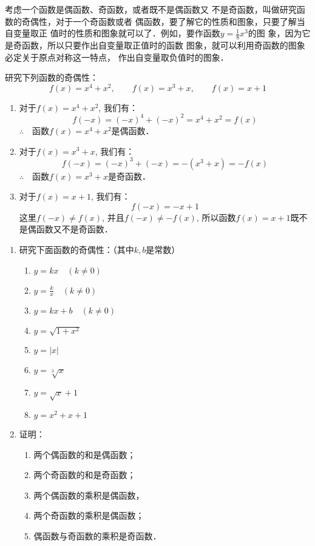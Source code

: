 考虑一个函数是偶函数、奇函数，或者既不是偶函数又
不是奇函数，叫做研究函数的奇偶性，对于一个奇函数或者
偶函数，要了解它的性质和图象，只要了解当自变量取正
值时的性质和图象就可以了．例如，要作函数$y=\frac{1}{8}x^3$的图
象，因为它是奇函数，所以只要作出自变量取正值时的函数
图象，就可以利用奇函数的图象必定关于原点对称这一特点，
作出自变量取负值时的图象．

\begin{example}
研究下列函数的奇偶性：
\[f(x)=x^4+x^2,\qquad f(x)=x^3+x,\qquad f(x)=x+1\]   
\end{example}

\begin{solution}
\begin{enumerate}
    \item 对于$f(x)=x^4+x^2$, 我们有：
    \[f(-x)=(-x)^4+(-x)^2=x^4+x^2=f(x)\]
    $\therefore\quad $函数$f(x)=x^4+x^2$是偶函数．
    \item 对于$f(x)=x^3+x$, 我们有：
    \[f(-x)=(-x)^3+(-x)=-(x^3+x)=-f(x)\]
    $\therefore\quad $函数$f(x)=x^3+x$是奇函数．
    \item 对于$f(x)=x+1$, 我们有：
    \[f(-x)=-x+1\]
    这里$f(-x)\ne f(x)$, 并且$f(-x)\ne -f(x)$, 所以函数$f(x)=
x+1$既不是偶函数又不是奇函数．
\end{enumerate} 
\end{solution}

\begin{ex}
\begin{enumerate}
    \item  研究下面函数的奇偶性：（其中$k,b$是常数）
\begin{multicols}{2}
\begin{enumerate}
    \item $y=kx\quad (k\ne 0)$
    \item $y=\frac{k}{x}\quad (k\ne 0)$
    \item $y=kx+b\quad (k\ne 0)$
    \item $y=\sqrt{1+x^2}$
    \item $y=|x|$
    \item $y=\sqrt[3]{x}$
    \item $y=\sqrt{x}+1$
    \item $y=x^2+x+1$
\end{enumerate}
\end{multicols}
\item 证明：
\begin{enumerate}
    \item 两个偶函数的和是偶函数；
    \item 两个奇函数的和是奇函数；
    \item 两个偶函数的乘积是偶函数，
    \item 两个奇函数的乘积是偶函数；
    \item 偶函数与奇函数的乘积是奇函数．
\end{enumerate}
\end{enumerate}
\end{ex}

